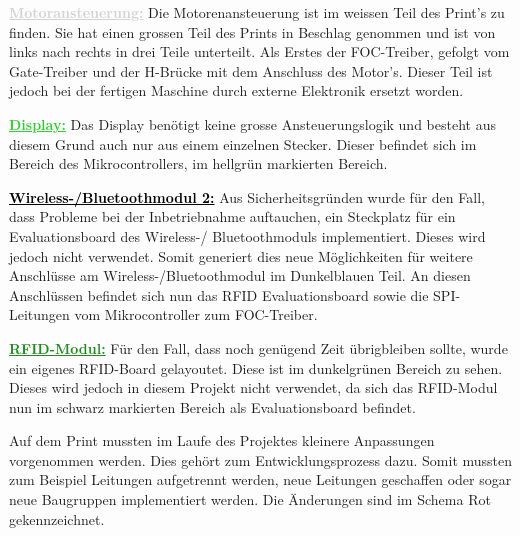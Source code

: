 \textcolor{lightgray}{\textbf{\underline{Motoransteuerung:}}}
Die Motorenansteuerung ist im weissen Teil des Print's zu finden. Sie hat einen grossen Teil des Prints in Beschlag genommen und ist von links nach rechts in drei Teile unterteilt. Als Erstes der FOC-Treiber, gefolgt vom Gate-Treiber und der H-Brücke mit dem Anschluss des Motor's. Dieser Teil ist jedoch bei der fertigen Maschine durch externe Elektronik ersetzt worden. 

\textcolor{LimeGreen}{\textbf{\underline{Display:}}}
Das Display benötigt keine grosse Ansteuerungslogik und besteht aus diesem Grund auch nur aus einem einzelnen Stecker. Dieser befindet sich im Bereich des Mikrocontrollers, im hellgrün markierten Bereich.

\textcolor{black}{\textbf{\underline{Wireless-/Bluetoothmodul 2:}}}
Aus Sicherheitsgründen wurde für den Fall, dass Probleme bei der Inbetriebnahme auftauchen, ein Steckplatz für ein Evaluationsboard des Wireless-/ Bluetoothmoduls implementiert. Dieses wird jedoch nicht verwendet. Somit generiert dies neue Möglichkeiten für weitere Anschlüsse am Wireless-/Bluetoothmodul im Dunkelblauen Teil. An diesen Anschlüssen befindet sich nun das RFID Evaluationsboard sowie die SPI-Leitungen vom Mikrocontroller zum FOC-Treiber. 

\textcolor{ForestGreen}{\textbf{\underline{RFID-Modul:}}}
Für den Fall, dass noch genügend Zeit übrigbleiben sollte, wurde ein eigenes RFID-Board gelayoutet. Diese ist im dunkelgrünen Bereich zu sehen. Dieses wird jedoch in diesem Projekt nicht verwendet, da sich das RFID-Modul nun im schwarz markierten Bereich als Evaluationsboard befindet. 

Auf dem Print mussten im Laufe des Projektes kleinere Anpassungen vorgenommen werden. Dies gehört zum Entwicklungsprozess dazu. Somit mussten zum Beispiel Leitungen aufgetrennt werden, neue Leitungen geschaffen oder sogar neue Baugruppen implementiert werden. Die Änderungen sind im Schema Rot gekennzeichnet.